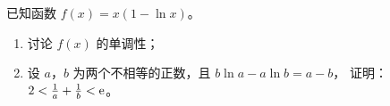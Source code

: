 \documentclass[zihao = -4]{exam-zh}
\begin{document}
\begin{problem}[points = 12]
  已知函数 $f(x) = x (1 - \ln x)$。
  \begin{enumerate}
    \item 讨论 $f(x)$ 的单调性；
    \item 设 $a$，$b$ 为两个不相等的正数，且 $b \ln a - a \ln b = a - b$，
      证明：$2 < \frac{1}{a} + \frac{1}{b} < \mathrm{ e }$。
  \end{enumerate}
\end{problem}
\end{document}
